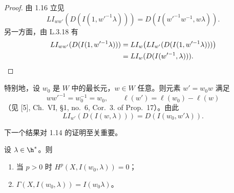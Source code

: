 \begin{proof}
由 1.16 立见
$$LI_{ww'}(D(I(1,w'^{-1}\lambda)))=D(I(w'^{-1}w^{-1},w\lambda)).$$
另一方面，由 L.3.18 有
\begin{align*}
LI_{ww'}(D(I(1,w'^{-1}\lambda)))&=LI_w\bigl(LI_{w'}(D(I(1,w'^{-1}\lambda)))\bigr)\\
&=LI_w(D(I(w'^{-1},\lambda))).\qedhere
\end{align*}
\end{proof}

特别地，设 $w_0$ 是 $W$ 中的最长元，$w\in W$ 任意。则元素 $w'=w_0w$ 满足
$$ww'^{-1}=w_0^{-1}=w_0,\qquad\ell(w')=\ell(w_0)-\ell(w)$$
（见 [5], Ch.~VI, \S1, no.~6, Cor.~3. of Prop.~17）。由此
$$LI_{w'}(D(I(w,\lambda)))=D(I(w_0,w'\lambda)).$$

下一个结果对 1.14 的证明至关重要。

\begin{lemma}\label{lem:05.1.18}
设 $\lambda\in\h^*$。则
\begin{enumerate}[label=(\roman*)]
\item 当 $p>0$ 时 $H^p(X,I(w_0,\lambda))=0$；
\item $\Gamma(X,I(w_0,\lambda))=I(w_0\lambda)$。
\end{enumerate}
\end{lemma}

